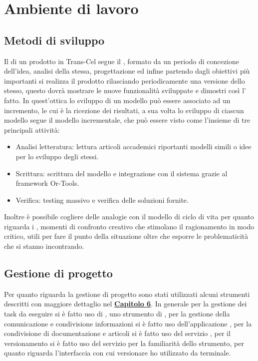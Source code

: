 \section{Ambiente di lavoro}
\subsection{Metodi di sviluppo}
Il  di un prodotto in Trans-Cel segue il , formato da un periodo di concezione dell'idea, analisi della stessa, progettazione ed infine partendo dagli obiettivi più importanti si realizza il prodotto rilasciando periodicamente una versione dello stesso, questo dovrà mostrare le nuove funzionalità sviluppate e dimostri così l' fatto. In quest'ottica lo sviluppo di un modello può essere associato ad un incremento, le cui  è la ricezione dei risultati, a sua volta lo sviluppo di ciascun modello segue il modello incrementale, che può essere visto come l'insieme di tre principali attività:
\begin{itemize}
	\item Analisi letteratura: lettura articoli accademici riportanti modelli simili o idee per lo sviluppo degli stessi.
	\item Scrittura: scrittura del modello e integrazione con il sistema grazie al framework Or-Tools.
	\item Verifica: testing massivo e verifica delle soluzioni fornite.
\end{itemize}
Inoltre è possibile cogliere delle analogie con il modello di ciclo di vita  per quanto riguarda i , momenti di confronto creativo che stimolano il ragionamento in modo critico, utili per fare il punto della situazione oltre che esporre le problematicità che si stanno incontrando.

\subsection{Gestione di progetto}
Per quanto riguarda la gestione di progetto sono stati utilizzati alcuni strumenti descritti con maggiore dettaglio nel \hyperlink{(chap:capitolo6)}{\textbf{Capitolo 6}}. In generale per la gestione dei task da eseguire si è fatto uso di , uno strumento di , per la gestione della comunicazione e condivisione informazioni si è fatto uso dell'applicazione , per la condivisione di documentazione e articoli si è fatto uso del servizio , per il versionamento si è fatto uso del servizio  per la familiarità dello strumento, per quanto riguarda l'interfaccia con cui versionare ho utilizzato  da terminale.
	

